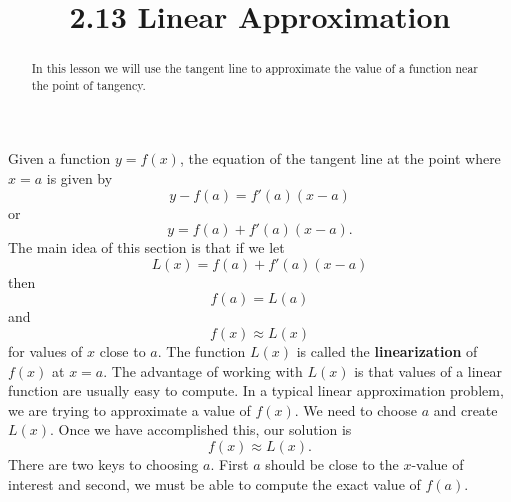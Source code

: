 \documentclass{ximera}
\title{2.13 Linear Approximation}
\begin{document}
\begin{abstract}
In this lesson we will use the tangent line to approximate the value of a 
function near the point of tangency.
\end{abstract}

\maketitle


Given a function $y=f(x)$, the equation of the tangent line
at the point where $x = a$ is given by
\[y-f(a) = f'(a)(x - a)\]
or
\[y = f(a) + f'(a)(x - a).\]
The main idea of this section is that if we let 
\[L(x) = f(a) + f'(a)(x - a)\] then 
\[f(a) = L(a)\]
and
\[f(x) \approx L(x)\]
for values of $x$ close to $a$. The function $L(x)$ is called the \textbf{linearization} of $f(x)$ at $x = a$. 
The advantage of working with $L(x)$ is that values of a linear 
function are usually easy to compute.
In a typical linear approximation problem, we are trying to approximate a value of $f(x)$. We need to choose $a$ and create
$L(x)$. Once we have accomplished this, our solution is 
\[f(x) \approx L(x).\]
There are two keys to choosing $a$. First $a$ should be close to the $x$-value of interest and second, 
we must be able to compute the exact value of $f(a)$.



\begin{image}
\end{image}
\end{document}
